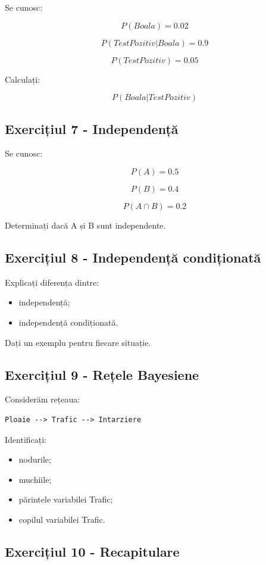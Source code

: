 \documentclass[12pt,a4paper]{article}
\begin{document}
Se cunosc:

\[
P(Boala)=0.02
\]

\[
P(TestPozitiv|Boala)=0.9
\]

\[
P(TestPozitiv)=0.05
\]

Calculați:

\[
P(Boala|TestPozitiv)
\]

\subsection{Exercițiul 7 - Independență}

Se cunosc:

\[
P(A)=0.5
\]

\[
P(B)=0.4
\]

\[
P(A \cap B)=0.2
\]

Determinați dacă A și B sunt independente.

\subsection{Exercițiul 8 - Independență condiționată}

Explicați diferența dintre:

\begin{itemize}
\item independență;
\item independență condiționată.
\end{itemize}

Dați un exemplu pentru fiecare situație.

\subsection{Exercițiul 9 - Rețele Bayesiene}

Considerăm rețeaua:

\begin{verbatim}
Ploaie --> Trafic --> Intarziere
\end{verbatim}

Identificați:

\begin{itemize}
\item nodurile;
\item muchiile;
\item părintele variabilei Trafic;
\item copilul variabilei Trafic.
\end{itemize}

\subsection{Exercițiul 10 - Recapitulare}
\end{document}
